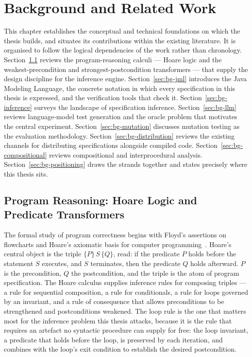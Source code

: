 \chapter{Background and Related Work}
\label{ch:background}

This chapter establishes the conceptual and technical foundations on which
the thesis builds, and situates its contributions within the existing
literature. It is organised to follow the logical dependencies of the work
rather than chronology. Section~\ref{sec:bg-reasoning} reviews the
program-reasoning calculi --- Hoare logic and the weakest-precondition and
strongest-postcondition transformers --- that supply the design discipline
for the inference engine. Section~\ref{sec:bg-jml} introduces the Java
Modeling Language, the concrete notation in which every specification in this
thesis is expressed, and the verification tools that check it.
Section~\ref{sec:bg-inference} surveys the landscape of specification
inference. Section~\ref{sec:bg-llm} reviews language-model test generation and
the oracle problem that motivates the central experiment.
Section~\ref{sec:bg-mutation} discusses mutation testing as the evaluation
methodology. Section~\ref{sec:bg-distribution} reviews the existing channels
for distributing specifications alongside compiled code.
Section~\ref{sec:bg-compositional} reviews compositional and interprocedural
analysis. Section~\ref{sec:bg-positioning} draws the strands together and
states precisely where this thesis sits.

\section{Program Reasoning: Hoare Logic and Predicate Transformers}
\label{sec:bg-reasoning}

The formal study of program correctness begins with Floyd's assertions on
flowcharts and Hoare's axiomatic basis for computer
programming~\cite{hoare1969axiomatic}. Hoare's central object is the triple
$\{P\}\,S\,\{Q\}$, read: if the predicate $P$ holds before the statement $S$
executes, and $S$ terminates, then the predicate $Q$ holds afterward. $P$ is
the precondition, $Q$ the postcondition, and the triple is the atom of
program specification. The Hoare calculus supplies inference rules for
composing triples --- a rule for sequential composition, a rule for
conditionals, a rule for loops governed by an invariant, and a rule of
consequence that allows preconditions to be strengthened and postconditions
weakened. The loop rule is the one that matters most for the inference problem
this thesis attacks, because it is the rule that requires an artefact no
syntactic procedure can supply for free: the loop invariant, a predicate that
holds before the loop, is preserved by each iteration, and combines with the
loop's exit condition to establish the desired postcondition.

